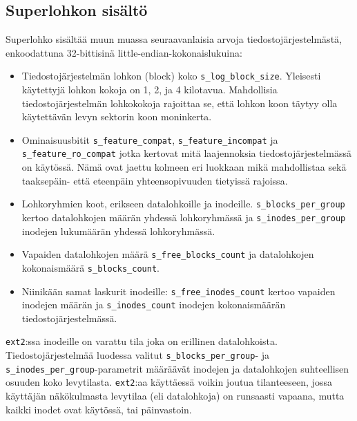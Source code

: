 \subsection{Superlohkon sisältö}
Superlohko sisältää muun muassa seuraavanlaisia arvoja tiedostojärjestelmästä, enkoodattuna 32-bittisinä little-endian-kokonaislukuina:
\begin{itemize}
    \item Tiedostojärjestelmän lohkon (block) koko \texttt{s\_log\_block\_size}. Yleisesti käytettyjä lohkon kokoja on 1, 2, ja 4 kilotavua.
          Mahdollisia tiedostojärjestelmän lohkokokoja rajoittaa se, että lohkon koon täytyy olla käytettävän levyn sektorin koon moninkerta.
    \item Ominaisuusbitit \texttt{s\_\-feature\_\-compat}, \texttt{s\_\-feature\_\-incompat} ja \texttt{s\_feature\_\-ro\_\-compat} jotka kertovat mitä laajennoksia tiedostojärjestelmässä on käytössä.
          Nämä ovat jaettu kolmeen eri luokkaan mikä mahdollistaa sekä taaksepäin- että eteenpäin yhteensopivuuden tietyissä rajoissa.
    \item Lohkoryhmien koot, erikseen datalohkoille ja inodeille.
          \texttt{s\_\-blocks\_\-per\_\-group} kertoo datalohkojen määrän yhdessä lohkoryhmässä ja \texttt{s\_inodes\_\-per\_\-group} inodejen lukumäärän yhdessä lohkoryhmässä.
    \item Vapaiden datalohkojen määrä \texttt{s\_\-free\_\-blocks\_\-count} ja datalohkojen kokonaismäärä \texttt{s\_\-blocks\_\-count}.
    \item Niinikään samat laskurit inodeille: \texttt{s\_free\_\-inodes\_\-count} kertoo vapaiden inodejen määrän ja \texttt{s\_inodes\_count} inodejen kokonaismäärän tiedostojärjestelmässä.
\end{itemize}

\texttt{ext2}:ssa inodeille on varattu tila joka on erillinen datalohkoista.
Tiedostojärjestelmää luodessa valitut \texttt{s\_blocks\_\-per\_\-group}- ja \texttt{s\_inodes\_\-per\_\-group}-parametrit määräävät inodejen ja datalohkojen suhteellisen osuuden koko levytilasta.
\texttt{ext2}:aa käyttäessä voikin joutua tilanteeseen, jossa käyttäjän näkökulmasta levytilaa (eli datalohkoja) on runsaasti vapaana, mutta kaikki inodet ovat käytössä, tai päinvastoin.

